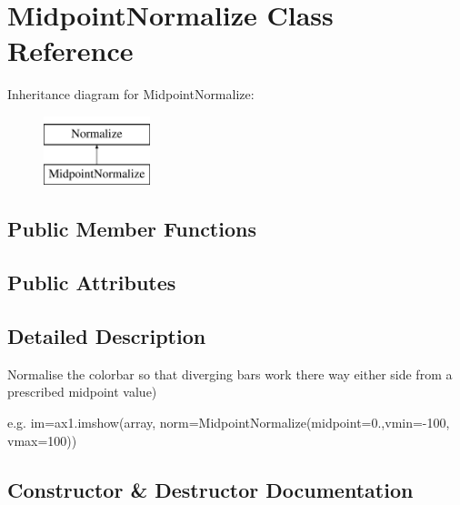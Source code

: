 \hypertarget{classopenbu_1_1utils_1_1functions_1_1_midpoint_normalize}{}\section{Midpoint\+Normalize Class Reference}
\label{classopenbu_1_1utils_1_1functions_1_1_midpoint_normalize}
Inheritance diagram for Midpoint\+Normalize\+:\begin{figure}[H]
\begin{center}
\leavevmode
\includegraphics[height=2.000000cm]{classopenbu_1_1utils_1_1functions_1_1_midpoint_normalize}
\end{center}
\end{figure}
\subsection*{Public Member Functions}
\subsection*{Public Attributes}


\subsection{Detailed Description}
\begin{DoxyVerb}Normalise the colorbar so that diverging bars work there way either side from a prescribed midpoint value)

e.g. im=ax1.imshow(array, norm=MidpointNormalize(midpoint=0.,vmin=-100, vmax=100))
\end{DoxyVerb}
 

\subsection{Constructor \& Destructor Documentation}
\mbox{\label{classopenbu_1_1utils_1_1functions_1_1_midpoint_normalize_a87831fcbb459c9db73a8c7ce1d07a760}} 
